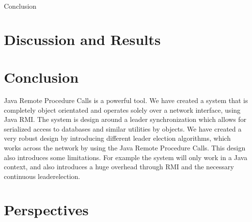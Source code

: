 {Conclusion}
\section{Discussion and Results}

\section{Conclusion}
Java Remote Procedure Calls is a powerful tool. We have created a system that is completely object orientated and operates solely over a network interface, using Java RMI. The system is design around a leader synchronization which allows for serialized access to databases and similar utilities by objects. We have created a very robust design by introducing different leader election algorithms, which works across the network by using the Java Remote Procedure Calls.
This design also introduces some limitations. For example the system will only work in a Java context, and also introduces a huge overhead through RMI and the necessary continuous leaderelection.


\section{Perspectives}
